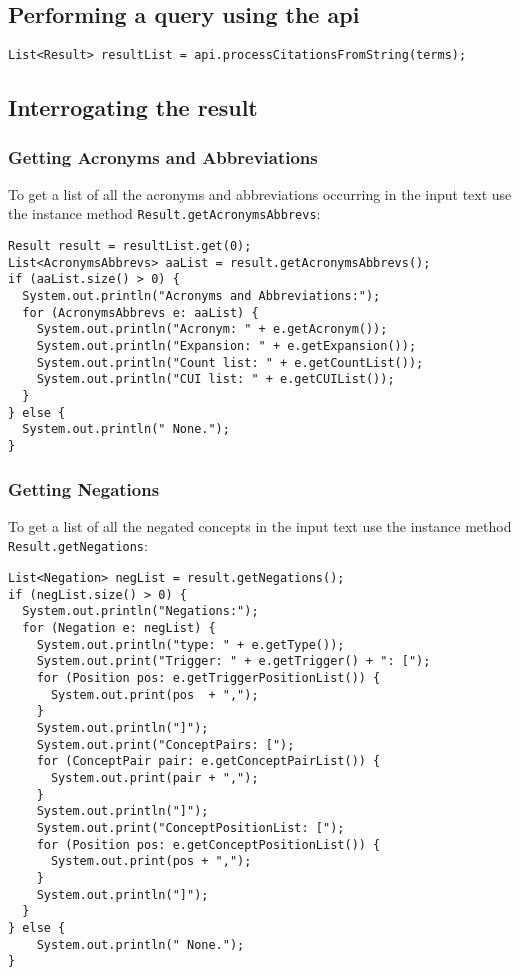 \documentclass[11pt]{article}
\begin{document}
\subsection{Performing a query using the api}
\label{Performing a query using the api}
\begin{verbatim}
List<Result> resultList = api.processCitationsFromString(terms);
\end{verbatim}

\subsection{Interrogating the result}
\label{Interrogating the result}

\subsubsection{Getting Acronyms and Abbreviations}
\label{Getting Acronyms and Abbreviations}

To get a list of all the acronyms and abbreviations occurring in the
input text use the instance method \texttt{Result.getAcronymsAbbrevs}:

\begin{verbatim}
Result result = resultList.get(0);
List<AcronymsAbbrevs> aaList = result.getAcronymsAbbrevs();
if (aaList.size() > 0) {
  System.out.println("Acronyms and Abbreviations:");
  for (AcronymsAbbrevs e: aaList) {
    System.out.println("Acronym: " + e.getAcronym());
    System.out.println("Expansion: " + e.getExpansion());
    System.out.println("Count list: " + e.getCountList());
    System.out.println("CUI list: " + e.getCUIList());
  }
} else {
  System.out.println(" None.");
}
\end{verbatim}

\subsubsection{Getting Negations}
\label{Getting Negations}

To get a list of all the negated concepts in the input text use the
instance method \texttt{Result.getNegations}:

\begin{verbatim}
List<Negation> negList = result.getNegations();
if (negList.size() > 0) {
  System.out.println("Negations:");
  for (Negation e: negList) {
    System.out.println("type: " + e.getType());
    System.out.print("Trigger: " + e.getTrigger() + ": [");
    for (Position pos: e.getTriggerPositionList()) {
      System.out.print(pos  + ",");
    }
    System.out.println("]");
    System.out.print("ConceptPairs: [");
    for (ConceptPair pair: e.getConceptPairList()) {
      System.out.print(pair + ",");
    }
    System.out.println("]");
    System.out.print("ConceptPositionList: [");
    for (Position pos: e.getConceptPositionList()) {
      System.out.print(pos + ",");
    }
    System.out.println("]");
  }
} else {
	System.out.println(" None.");
}
\end{verbatim}
\end{document}

